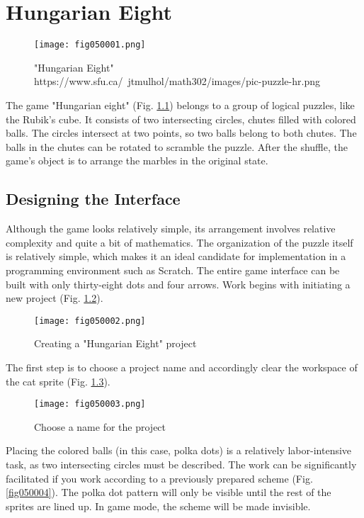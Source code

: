 \chapter{Hungarian Eight}

\begin{figure}[H]
   \centering
   \texttt{[image: fig050001.png]}
   \caption{"Hungarian Eight" \\ https://www.sfu.ca/~jtmulhol/math302/images/pic-puzzle-hr.png}
\label{fig050001}
\end{figure}

The game "Hungarian eight" (Fig. \ref{fig050001}) belongs to a group of logical puzzles, like the Rubik's cube. It consists of two intersecting circles, chutes filled with colored balls. The circles intersect at two points, so two balls belong to both chutes. The balls in the chutes can be rotated to scramble the puzzle. After the shuffle, the game's object is to arrange the marbles in the original state.

\section{Designing the Interface}

Although the game looks relatively simple, its arrangement involves relative complexity and quite a bit of mathematics. The organization of the puzzle itself is relatively simple, which makes it an ideal candidate for implementation in a programming environment such as Scratch. The entire game interface can be built with only thirty-eight dots and four arrows. Work begins with initiating a new project (Fig. \ref{fig050002}).

\begin{figure}[H]
   \centering
   \texttt{[image: fig050002.png]}
   \caption{Creating a "Hungarian Eight" project}
\label{fig050002}
\end{figure}

The first step is to choose a project name and accordingly clear the workspace of the cat sprite (Fig. \ref{fig050003}).

\begin{figure}[H]
   \centering
   \texttt{[image: fig050003.png]}
   \caption{Choose a name for the project}
\label{fig050003}
\end{figure}

Placing the colored balls (in this case, polka dots) is a relatively labor-intensive task, as two intersecting circles must be described. The work can be significantly facilitated if you work according to a previously prepared scheme (Fig. \ref{fig050004}). The polka dot pattern will only be visible until the rest of the sprites are lined up. In game mode, the scheme will be made invisible.

